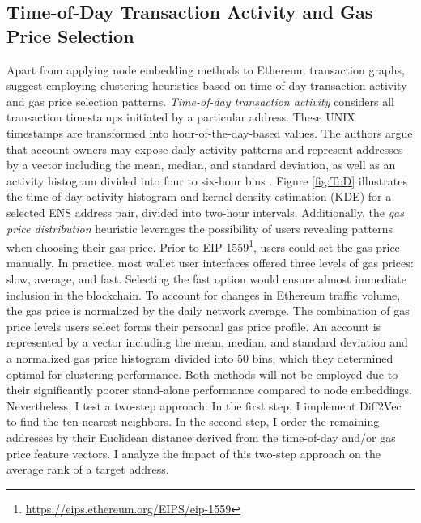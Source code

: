 \documentclass[12pt,a4paper,titlepage,oneside,english]{article}
\begin{document}
\subsection{Time-of-Day Transaction Activity and Gas Price Selection}
Apart from applying node embedding methods to Ethereum transaction graphs, \cite{Beres2020} suggest employing clustering heuristics based on time-of-day transaction activity and gas price selection patterns. \newline
\textit{Time-of-day transaction activity} considers all transaction timestamps initiated by a particular address. These UNIX timestamps are transformed into hour-of-the-day-based values. The authors argue that account owners may expose daily activity patterns and represent addresses by a vector including the mean, median, and standard deviation, as well as an activity histogram divided into four to six-hour bins \citep{Beres2020}.  Figure \ref{fig:ToD} illustrates the time-of-day activity histogram and kernel density estimation (KDE) for a selected ENS address pair, divided into two-hour intervals.\newline
Additionally, the \textit{gas price distribution} heuristic leverages the possibility of users revealing patterns when choosing their gas price. Prior to EIP-1559\footnote{\url{https://eips.ethereum.org/EIPS/eip-1559}}, users could set the gas price manually. In practice, most wallet user interfaces offered three levels of gas prices: slow, average, and fast. Selecting the fast option would ensure almost immediate inclusion in the blockchain. To account for changes in Ethereum traffic volume, the gas price is normalized by the daily network average. The combination of gas price levels users select forms their personal gas price profile. An account is represented by a vector including the mean, median, and standard deviation and a normalized gas price histogram divided into 50 bins, which they determined optimal for clustering performance. \citep{Beres2020} \newline
Both methods will not be employed due to their significantly poorer stand-alone performance compared to node embeddings. Nevertheless, I test a two-step approach: In the first step, I implement Diff2Vec to find the ten nearest neighbors. In the second step, I order the remaining addresses by their Euclidean distance derived from the time-of-day and/or gas price feature vectors. I analyze the impact of this two-step approach on the average rank of a target address.
\end{document}
